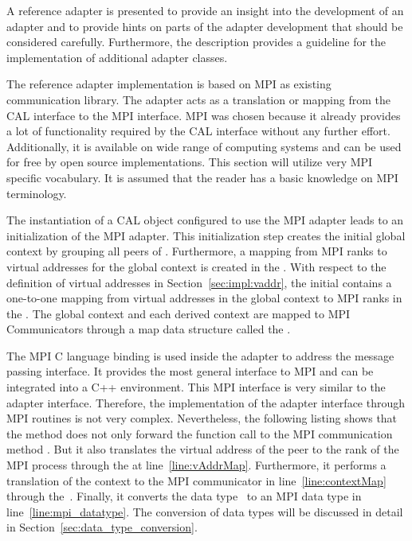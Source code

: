 A reference adapter is presented to provide an insight into the
development of an adapter and to provide hints on parts of the adapter
development that should be considered carefully. Furthermore, the
description provides a guideline for the implementation of additional
adapter classes.

The reference adapter implementation is based on MPI as existing
communication library. The adapter acts as a translation or mapping
from the CAL interface to the MPI interface.  MPI was chosen because
it already provides a lot of functionality required by the CAL
interface without any further effort. Additionally, it is available on
wide range of computing systems and can be used for free by open
source implementations. This section will utilize very MPI specific
vocabulary. It is assumed that the reader has a basic knowledge on MPI
terminology.

The instantiation of a CAL object configured to use the MPI adapter
leads to an initialization of the MPI adapter. This initialization
step creates the initial global context by grouping all peers of
.  Furthermore, a mapping from MPI ranks to
virtual addresses for the global context is created in the
.  With respect to the definition of virtual addresses
in Section~\ref{sec:impl:vaddr}, the initial  contains a
one-to-one mapping from virtual addresses in the global context to MPI
ranks in the .  The global context and each
derived context are mapped to MPI Communicators through a map data
structure called the .


The MPI C language binding is used inside the adapter to address the
message passing interface.  It provides the most general interface to
MPI and can be integrated into a C++ environment.  This MPI interface
is very similar to the adapter interface. Therefore, the
implementation of the adapter interface through MPI routines is not
very complex. Nevertheless, the following listing shows that the
 method does not only forward the function call to
the MPI communication method .  But it also translates
the virtual address  of the peer to the rank of the
MPI process through the  at line~\ref{line:vAddrMap}.
Furthermore, it performs a translation of the context to the MPI
communicator in line~\ref{line:contextMap} through
the~. Finally, it converts the data type~
to an MPI data type in line~\ref{line:mpi_datatype}.  The conversion
of data types will be discussed in detail in
Section~\ref{sec:data_type_conversion}.

